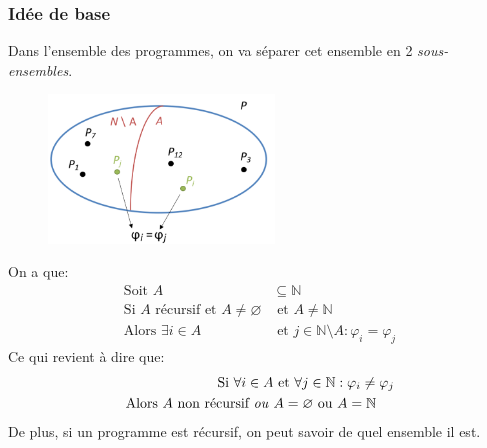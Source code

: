 \documentclass{report}
\begin{document}
\subsubsection{Idée de base}
Dans l'ensemble des programmes, on va séparer cet ensemble en 2 \textit{sous-ensembles}.
\begin{figure}[H]
\centering
\includegraphics[width=6cm]{img/rice.png}
\end{figure}
On a que:
\begin{align*}
\text{Soit } A &\subseteq \mathbb{N}\\
\text{Si } A \text{ récursif et } A \neq \varnothing &\text{ et } A \neq \mathbb{N}\\
\text{Alors } \exists i \in A &\text{ et } j \in \mathbb{N} \setminus A : \varphi_i = \varphi_j 
\end{align*}
Ce qui revient à dire que:
\begin{align*}
\text{Si } \forall i \in A &\text{ et } \forall j \in \mathbb{N}: \varphi_i \neq \varphi_j\\
\text{Alors } A \text{ non récursif \textit{ou} } &A = \varnothing \text{ ou } A = \mathbb{N}
\end{align*}
De plus, si un programme est récursif, on peut savoir de quel ensemble il est.
\end{document}
